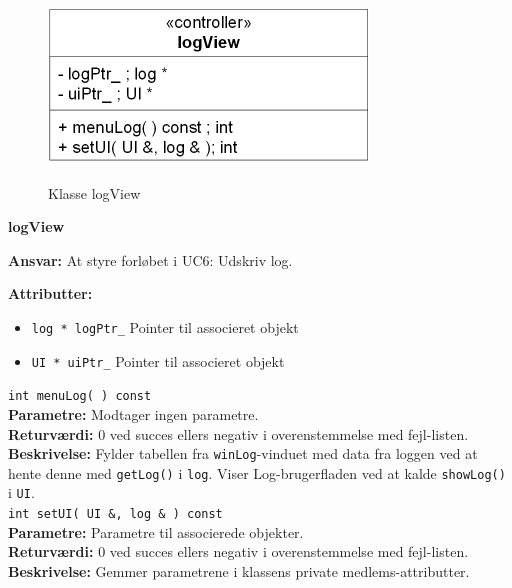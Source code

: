 \begin{figure}[htbp] \centering
{\includegraphics[scale=1.5]{filer/design/Klassediagrammer/sw_logView}}
\caption{Klasse logView}
\label{fig:logView klassediagram}
\end{figure}

{\centering
\textbf{logView}\par
}
\textbf{Ansvar:} At styre forløbet i UC6: Udskriv log. \

\textbf{Attributter:}
\begin{itemize}
	\item \verb+log * logPtr_+ Pointer til associeret objekt
	\item \verb+UI * uiPtr_+ Pointer til associeret objekt
\end{itemize}

\verb+int menuLog( ) const+ \\
\textbf{Parametre:} Modtager ingen parametre. \\
\textbf{Returværdi:} 0 ved succes ellers negativ i overenstemmelse med fejl-listen. \\
\textbf{Beskrivelse:} Fylder tabellen fra \verb+winLog+-vinduet med data fra loggen ved at hente denne med \verb+getLog()+ i \verb+log+. Viser Log-brugerfladen ved at kalde \verb+showLog()+ i \verb+UI+.\\

\verb+int setUI( UI &, log & ) const+ \\
\textbf{Parametre:} Parametre til associerede objekter. \\
\textbf{Returværdi:} 0 ved succes ellers negativ i overenstemmelse med fejl-listen. \\
\textbf{Beskrivelse:} Gemmer parametrene i klassens private medlems-attributter. \\
